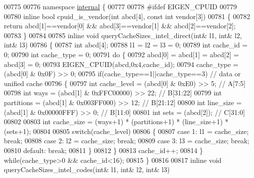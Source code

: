\begin{DoxyCode}
{00775 
00776 \textcolor{keyword}{namespace }\hyperlink{namespaceinternal}{internal} \{
00777 
00778 \textcolor{preprocessor}{#ifdef EIGEN\_CPUID}
00779 
00780 \textcolor{keyword}{inline} \textcolor{keywordtype}{bool} cpuid\_is\_vendor(\textcolor{keywordtype}{int} abcd[4], \textcolor{keyword}{const} \textcolor{keywordtype}{int} vendor[3])
00781 \{
00782   \textcolor{keywordflow}{return} abcd[1]==vendor[0] && abcd[3]==vendor[1] && abcd[2]==vendor[2];
00783 \}
00784 
00785 \textcolor{keyword}{inline} \textcolor{keywordtype}{void} queryCacheSizes\_intel\_direct(\textcolor{keywordtype}{int}& l1, \textcolor{keywordtype}{int}& l2, \textcolor{keywordtype}{int}& l3)
00786 \{
00787   \textcolor{keywordtype}{int} abcd[4];
00788   l1 = l2 = l3 = 0;
00789   \textcolor{keywordtype}{int} cache\_id = 0;
00790   \textcolor{keywordtype}{int} cache\_type = 0;
00791   \textcolor{keywordflow}{do} \{
00792     abcd[0] = abcd[1] = abcd[2] = abcd[3] = 0;
00793     EIGEN\_CPUID(abcd,0x4,cache\_id);
00794     cache\_type  = (abcd[0] & 0x0F) >> 0;
00795     \textcolor{keywordflow}{if}(cache\_type==1||cache\_type==3) \textcolor{comment}{// data or unified cache}
00796     \{
00797       \textcolor{keywordtype}{int} cache\_level = (abcd[0] & 0xE0) >> 5;  \textcolor{comment}{// A[7:5]}
00798       \textcolor{keywordtype}{int} ways        = (abcd[1] & 0xFFC00000) >> 22; \textcolor{comment}{// B[31:22]}
00799       \textcolor{keywordtype}{int} partitions  = (abcd[1] & 0x003FF000) >> 12; \textcolor{comment}{// B[21:12]}
00800       \textcolor{keywordtype}{int} line\_size   = (abcd[1] & 0x00000FFF) >>  0; \textcolor{comment}{// B[11:0]}
00801       \textcolor{keywordtype}{int} sets        = (abcd[2]);                    \textcolor{comment}{// C[31:0]}
00802 
00803       \textcolor{keywordtype}{int} cache\_size = (ways+1) * (partitions+1) * (line\_size+1) * (sets+1);
00804 
00805       \textcolor{keywordflow}{switch}(cache\_level)
00806       \{
00807         \textcolor{keywordflow}{case} 1: l1 = cache\_size; \textcolor{keywordflow}{break};
00808         \textcolor{keywordflow}{case} 2: l2 = cache\_size; \textcolor{keywordflow}{break};
00809         \textcolor{keywordflow}{case} 3: l3 = cache\_size; \textcolor{keywordflow}{break};
00810         \textcolor{keywordflow}{default}: \textcolor{keywordflow}{break};
00811       \}
00812     \}
00813     cache\_id++;
00814   \} \textcolor{keywordflow}{while}(cache\_type>0 && cache\_id<16);
00815 \}
00816 
00817 \textcolor{keyword}{inline} \textcolor{keywordtype}{void} queryCacheSizes\_intel\_codes(\textcolor{keywordtype}{int}& l1, \textcolor{keywordtype}{int}& l2, \textcolor{keywordtype}{int}& l3)
}
\end{DoxyCode}
